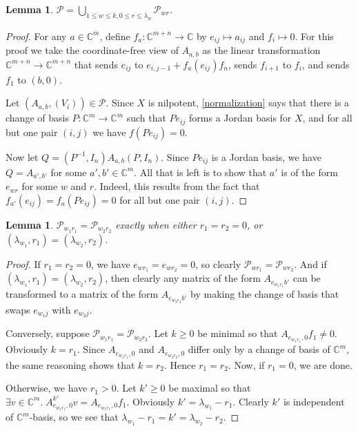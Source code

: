\documentclass[12pt,psamsfonts]{article}
\newtheorem{lemma}[theorem]{Lemma}
\begin{document}
\begin{lemma}\label{pwr_union}
    \(\mathcal{P} = \bigcup_{1 \leq w \leq k, 0 \leq r \leq \lambda_{w}} \mathcal{P}_{wr}\).
\end{lemma}
\begin{proof}
    For any \(a \in \mathbb{C}^m\), define \(f_a : \mathbb{C}^{m + n} \to \mathbb{C}\) by \(e_{ij} \mapsto a_{ij}\) and \(f_i \mapsto 0\).
    For this proof we take the coordinate-free view of \(A_{a,b}\) as the linear transformation \(\mathbb{C}^{m + n} \to \mathbb{C}^{m + n}\) that sends \(e_{ij}\) to \(e_{i,j-1} + f_a(e_{ij}) f_n\), sends \(f_{i + 1}\) to \(f_i\), and sends \(f_1\) to \((b, 0)\).
    \par Let \((A_{a, b}, (V_i)) \in \mathcal{P}\).
    Since \(X\) is nilpotent, \cref{normalization} says that there is a change of basis \(P : \mathbb{C}^m \to \mathbb{C}^m\) such that \(Pe_{ij}\) forms a Jordan basis for \(X\), and for all but one pair \((i, j)\) we have \(f(Pe_{ij}) = 0\).
    \par Now let \(Q = (P^{-1}, I_n)A_{a,b}(P, I_n)\).
    Since \(Pe_{ij}\) is a Jordan basis, we have \(Q = A_{a',b'}\) for some \(a',b' \in \mathbb{C}^m\).
    All that is left is to show that \(a'\) is of the form \(e_{wr}\) for some \(w\) and \(r\).
    Indeed, this results from the fact that \(f_{a'}(e_{ij}) = f_a(Pe_{ij}) = 0\) for all but one pair \((i,j)\).
\end{proof}
\begin{lemma}
    \(\mathcal{P}_{w_1r_1} = \mathcal{P}_{w_2r_2}\) exactly when either \(r_1 = r_2 = 0\), or \((\lambda_{w_1}, r_1) = (\lambda_{w_2}, r_2)\).
\end{lemma}
\begin{proof}
    If \(r_1 = r_2 = 0\), we have \(e_{wr_1} = e_{wr_2} = 0\), so clearly \(\mathcal{P}_{wr_1} = \mathcal{P}_{wr_2}\).
    And if \((\lambda_{w_1}, r_1) = (\lambda_{w_2}, r_2)\), then clearly any matrix of the form \(A_{e_{w_1r_1}b'}\) can be transformed to a matrix of the form \(A_{e_{w_2r_2}b'}\) by making the change of basis that swaps \(e_{w_1j}\) with \(e_{w_2j}\).
    \par Conversely, suppose \(\mathcal{P}_{w_1r_1} = \mathcal{P}_{w_2r_2}\).
    Let \(k \geq 0\) be minimal so that \(A_{e_{w_1r_1},0} f_1 \neq 0\).
    Obviously \(k = r_1\).
    Since \(A_{e_{w_1r_1},0}\) and \(A_{e_{w_2r_2},0}\) differ only by a change of basis of \(\mathbb{C}^m\), the same reasoning shows that \(k = r_2\).
    Hence \(r_1 = r_2\).
    Now, if \(r_1 = 0\), we are done.
    \par Otherwise, we have \(r_1 > 0\).
    Let \(k' \geq 0\) be maximal so that \(\exists v \in \mathbb{C}^m. \; A_{e_{w_1r_1},0}^{k'} v = A_{e_{w_1r_1},0} f_1\).
    Obviously \(k' = \lambda_{w_1} - r_1\).
    Clearly \(k'\) is independent of \(\mathbb{C}^m\)-basis, so we see that \(\lambda_{w_1} - r_1 = k' = \lambda_{w_2} - r_2\).
\end{proof}
\end{document}
